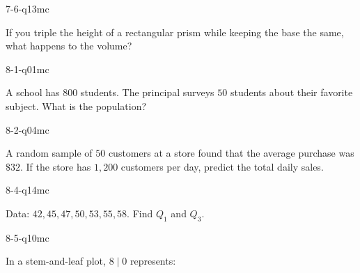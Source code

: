 \begin{practiceQuestion}{7-6-q13}{mc}
\begin{questionText}
If you triple the height of a rectangular prism while keeping the base the same, what happens to the volume?
\end{questionText}
\end{practiceQuestion}

\begin{practiceQuestion}{8-1-q01}{mc}
\begin{questionText}
A school has $800$ students. The principal surveys $50$ students about their favorite subject. What is the population?
\end{questionText}
\end{practiceQuestion}

\begin{practiceQuestion}{8-2-q04}{mc}
\begin{questionText}
A random sample of $50$ customers at a store found that the average purchase was $\$32$. If the store has $1{,}200$ customers per day, predict the total daily sales.
\end{questionText}
\end{practiceQuestion}

\begin{practiceQuestion}{8-4-q14}{mc}
\begin{questionText}
Data: $42, 45, 47, 50, 53, 55, 58$. Find $Q_1$ and $Q_3$.
\end{questionText}
\end{practiceQuestion}

\begin{practiceQuestion}{8-5-q10}{mc}
\begin{questionText}
In a stem-and-leaf plot, $8 \mid 0$ represents:
\end{questionText}
\end{practiceQuestion}

